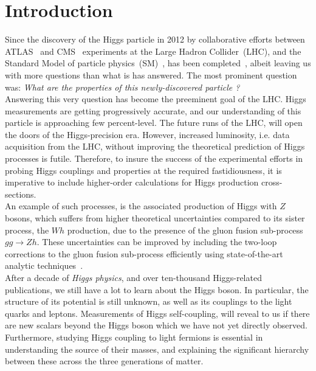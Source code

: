 

\chapter{Introduction}
Since the discovery of the Higgs particle in 2012 by collaborative efforts between ATLAS~\cite{ATLAS:2012yve} and CMS~\cite{CMS:2012qbp} experiments at the { L}arge { H}adron {C}ollider~(LHC), and the Standard Model of particle physics~(SM)~\cite{salam1,salam2,PhysRevLett.19.1264}, has been completed~\cite{PhysRevLett.13.321,PhysRevLett.13.508,HIGGS1964132,PhysRevLett.13.585,Guralnik:2009jd}, albeit leaving us with more questions than what is has answered. The most prominent question was: \textit{What are the properties of this newly-discovered particle ?}\\
%
Answering this very question has become the preeminent goal of the LHC. Higgs measurements are getting progressively accurate, and our understanding of this particle is approaching few percent-level. The future runs of the LHC, will open the doors of the Higgs-precision era. However, increased luminosity, i.e. data acquisition from the LHC, without improving the theoretical prediction of Higgs processes is futile. Therefore, to insure the success of the experimental efforts in probing Higgs couplings and properties at the required fastidiousness, it is imperative to include higher-order calculations for Higgs production cross-sections. \\ 
An example of such processes, is the associated production of Higgs with $Z$ bosons, which suffers from higher theoretical uncertainties compared to its sister process, the $Wh$ production, due to the presence of the gluon fusion sub-process $ gg \to Zh$. These uncertainties can be improved by including the two-loop corrections to the gluon fusion sub-process efficiently using state-of-the-art analytic techniques~\cite{Bonciani:2018omm}. 
%
 \\ After a decade of \emph{Higgs physics}, and over ten-thousand Higgs-related publications, we still have a lot to learn about the Higgs boson.  In particular,  the structure of its potential is still unknown, as well as its couplings to the light quarks and leptons. Measurements of Higgs self-coupling, will reveal to us if there are new scalars beyond the Higgs boson which we have not yet directly observed. Furthermore, studying Higgs coupling to light fermions is essential in understanding the source of their masses, and explaining the significant hierarchy between these across the three generations of matter. \\ 

